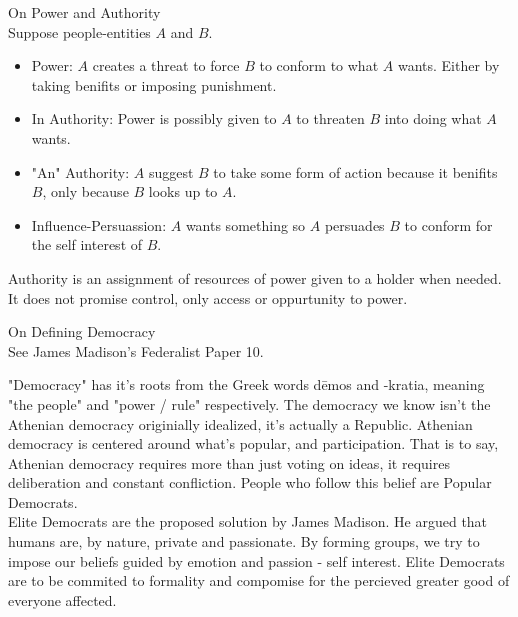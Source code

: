\documentclass{article}
\begin{document}
\noindent
\Large On Power and Authority\\
\normalsize
\noindent
Suppose people-entities $A$ and $B$.

\centering
{}
\raggedright

\begin{itemize}
  \item Power: $A$ creates a threat to force $B$ to conform to what $A$ wants. Either by taking benifits or imposing punishment.
  \item In Authority: Power is possibly given to $A$ to threaten $B$ into doing what $A$ wants.
  \item "An" Authority: $A$ suggest $B$ to take some form of action because it benifits $B$, only because $B$ looks up to $A$.
  \item Influence-Persuassion: $A$ wants something so $A$ persuades $B$ to conform for the self interest of $B$.
\end{itemize}

\noindent
Authority is an assignment of resources of power given to a holder when needed. It does not promise control, only access or oppurtunity to power.

\noindent
\Large
On Defining Democracy\\
\normalsize
\noindent
See James Madison's Federalist Paper 10.

\indent
"Democracy" has it's roots from the Greek words d\={e}mos and -kratia, meaning "the people" and "power / rule" respectively. The democracy we know isn't the Athenian democracy originially idealized, it's actually a Republic. Athenian democracy is centered around what's popular, and participation. That is to say, Athenian democracy requires more than just voting on ideas, it requires deliberation and constant confliction. People who follow this belief are Popular Democrats.\\

Elite Democrats are the proposed solution by James Madison. He argued that humans are, by nature, private and passionate. By forming groups, we try to impose our beliefs guided by emotion and passion - self interest. Elite Democrats are to be commited to formality and compomise for the percieved greater good of everyone affected.
\end{document}
